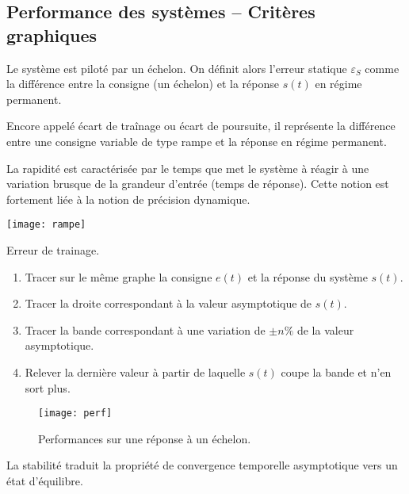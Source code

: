 \vspace{.1cm}

\subsection{Performance des systèmes -- Critères graphiques}

\vspace{.1cm}

\begin{defi}
Le système est piloté par un échelon. On définit alors l'erreur statique $\varepsilon_S$ comme la différence entre la consigne (un échelon) et la réponse $s(t)$ en régime permanent.
\end{defi}

\begin{defi}
Encore appelé écart de traînage ou écart de poursuite, il représente la différence entre une consigne variable de type rampe et la réponse en régime permanent. 
\end{defi}

\begin{defi}[Rapidité]

La rapidité est caractérisée par le temps que met le système à réagir à une
variation brusque de la grandeur d'entrée (temps de réponse). Cette notion est
fortement liée à la notion de précision dynamique.
\end{defi}

\begin{marginfigure}[-2cm]
\texttt{[image: rampe]}
\caption{Erreur de trainage.}
\end{marginfigure}


\begin{methode}%

\begin{enumerate}
 \item Tracer sur le même graphe la consigne $e(t)$ et la réponse du système
$s(t)$.
\item Tracer la droite correspondant à la valeur asymptotique de $s(t)$.
\item Tracer la bande correspondant à une variation de $\pm n\%$ de la valeur
asymptotique.
\item Relever la dernière valeur à partir de laquelle $s(t)$ coupe la bande et
n'en sort plus.
\end{enumerate}
\end{methode}


\begin{figure}[!h]
\centering
\texttt{[image: perf]}
\caption{Performances sur une réponse à un échelon.}
\end{figure}

\begin{defi}[Stabilité]

La stabilité traduit la propriété de convergence temporelle asymptotique vers
un état d'équilibre. 
\end{defi}



